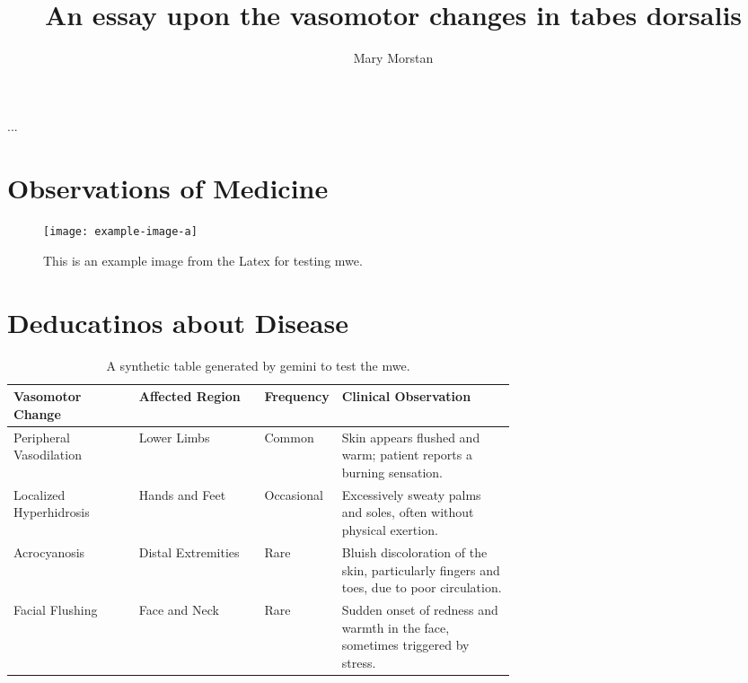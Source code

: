 \documentclass[jdecimal, citestyle=apa, 11pt]{maine-thesis}  %
\title{An essay upon the vasomotor changes in tabes dorsalis}					%
\author{Mary Morstan}					%
\begin{document}
\preliminary
\maketitle

\begin{abstract}
\Blindtext
\end{abstract}

\begin{layabstract}{...}	%
\blindtext
\end{layabstract}

\tableofcontents
\listoftables				%
\listoffigures				%

\mainmatter


\chapter{Observations of Medicine}
\blindtext
\begin{figure}[]
    \centering
    \texttt{[image: example-image-a]}
    \caption[Short Title for My Example Figure]{This is an example image from the Latex for testing mwe. \blindtext}
    \label{fig:example-a}
\end{figure}

\chapter{Deducatinos about Disease}
\blindtext
\begin{table}[h!]
    \centering
    \begin{tabularx}{\linewidth}{p{0.25\linewidth}p{0.25\linewidth}p{0.15\linewidth}X}
        \toprule
        \textbf{Vasomotor Change} & \textbf{Affected Region} & \textbf{Frequency} & \textbf{Clinical Observation} \\
        \midrule
        Peripheral Vasodilation & Lower Limbs & Common & Skin appears flushed and warm; patient reports a burning sensation. \\
        Localized Hyperhidrosis & Hands and Feet & Occasional & Excessively sweaty palms and soles, often without physical exertion. \\
        Acrocyanosis & Distal Extremities & Rare & Bluish discoloration of the skin, particularly fingers and toes, due to poor circulation. \\
        Facial Flushing & Face and Neck & Rare & Sudden onset of redness and warmth in the face, sometimes triggered by stress. \\
        \bottomrule
    \end{tabularx}
    \caption[Vasomotor Changes in Tabes Dorsalis]{A synthetic table generated by gemini to test the mwe.}
    \label{tab:vasomotor_changes2}
\end{table}
\end{document}
